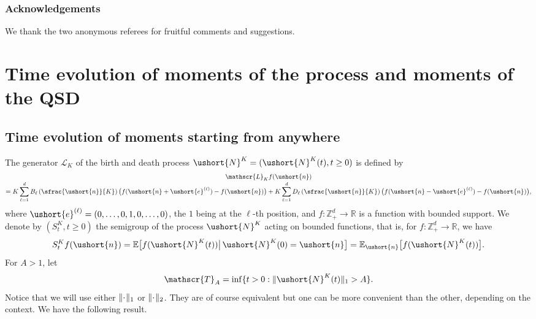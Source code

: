 \documentclass[10pt]{amsart}
\let\mathcal\mathscr
\numberwithin{equation}{section}
\theoremstyle{plain}
\theoremstyle{definition}
\newcommand{\E}{{\mathbb{E}}}
\newcommand{\real}{\mathbb{R}}
\newcommand{\zentiers}{{\mathbb{Z}}}
\newcommand{\domaine}{\zentiers_{+}^{d}}
\newcommand{\sK}{K}
\newcommand{\gen}{\mathscr{L}_{\sK}}
\newcommand{\vecn}{\ushort{n}}
\newcommand{\vece}[1]{\ushort{e}^{(#1)}}
\newcommand{\leproc}{\ushort{N}^{K}}
\newcommand{\norm}[1]{\|#1\|_{1}}\let\snorm\norm
\newcommand{\normdeux}[1]{\|#1\|_{2}}\let\snormdeux\normdeux
\begin{document}
\subsubsection*{Acknowledgements}
We thank the two anonymous referees for fruitful comments and suggestions.

\section{Time evolution of moments of the process and moments of the QSD}
\label{moment-process}

\subsection{Time evolution of moments starting from anywhere}
The generator $\gen$ of the birth and death process $\leproc=(\leproc(t),t\geq 0)$ is defined by
\begin{multline}\label{gene}
\gen f(\vecn)\\[-3pt]
= K\sum_{\ell=1}^{d}B_{\ell}\left(\sfrac{\vecn}{K}\right)\bigl(f(\vecn+\vece{\ell})-f(\vecn)\bigr)
+K\sum_{\ell=1}^{d}D_{\ell}\left(\sfrac{\vecn}{K}\right)\bigl(f(\vecn-\vece{\ell})-f(\vecn)\bigr),
\end{multline}
where $\vece{\ell}=(0,\ldots,0,1,0,\ldots,0)$, the $1$ being
at the $\ell$-th position, and $f:\domaine\to\real$ is a function with bounded support.
We denote by $(S^{\sK}_{t},t\geq 0)$ the semigroup of the process $\leproc$ acting on bounded
functions, that is, for $f:\domaine\to\real$, we have
\[
S^{\sK}_{t}f(\vecn)
=\E\bigl[f(\leproc(t))\big|\, \leproc(0)=\vecn\bigr]
=\E_{\vecn}\bigl[f(\leproc(t))\bigr].
\]
For $A>1$, let
\begin{equation}\label{leTA}
\mathcal{T}_A=\inf\{t>0:\|\leproc(t)\|_1>A\}.
\end{equation}
Notice that we will use either $\norm{\!\hspace{-0.5pt}\cdot\!}$ or $\normdeux{\!\hspace{-0.5pt}\cdot\!}$. They are of course equivalent but one can be more convenient than the other, depending on the context.
We have the following result.
\end{document}
